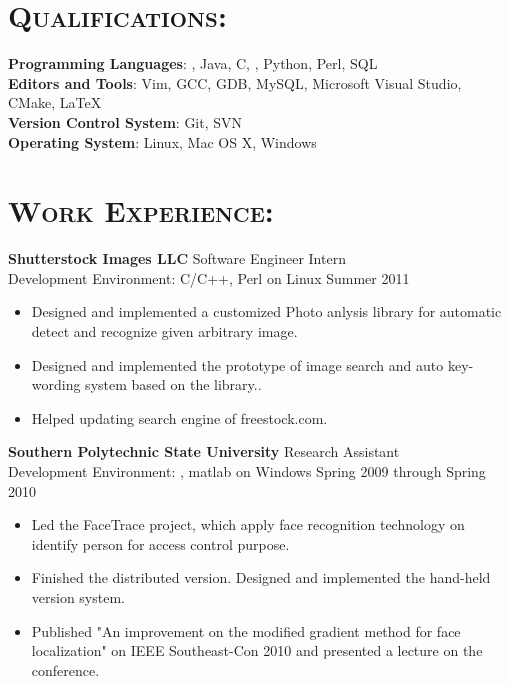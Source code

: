 \begin{resume}
\section{\textsc{Qualifications:}}

\textbf{\newline Programming Languages}: \Cplusplus, Java, C, \CSharp, Python, Perl, SQL \\
\textbf{Editors and Tools}: Vim, GCC, GDB, MySQL, Microsoft Visual Studio, CMake, \LaTeX \\
\textbf{Version Control System}: Git, SVN \\
\textbf{Operating System}: Linux, Mac OS X, Windows 


\section{\textsc{Work Experience:}}
\textbf{\newline Shutterstock Images LLC} \hfill Software Engineer Intern\\
Development Environment: C/C++, Perl on Linux \hfill Summer 2011
\begin{itemize}
    \item Designed and implemented a customized Photo anlysis library for automatic detect and recognize given arbitrary image.
    \item Designed and implemented the prototype of image search and auto key-wording system based on the library..
    \item Helped updating search engine of freestock.com.
\end{itemize}


\textbf{Southern Polytechnic State University} \hfill Research Assistant\\
Development Environment: \CSharp, matlab on Windows \hfill Spring 2009 through Spring 2010 
\begin{itemize}
 	\item Led the FaceTrace project, which apply face recognition
technology on identify person for access control purpose.
\item Finished the distributed version.
Designed and implemented the hand-held version system.    
    \item Published "An improvement on the
modified gradient method for face localization" on IEEE Southeast-Con 2010
and presented a lecture on the conference. 
\end{itemize}


\end{resume}
